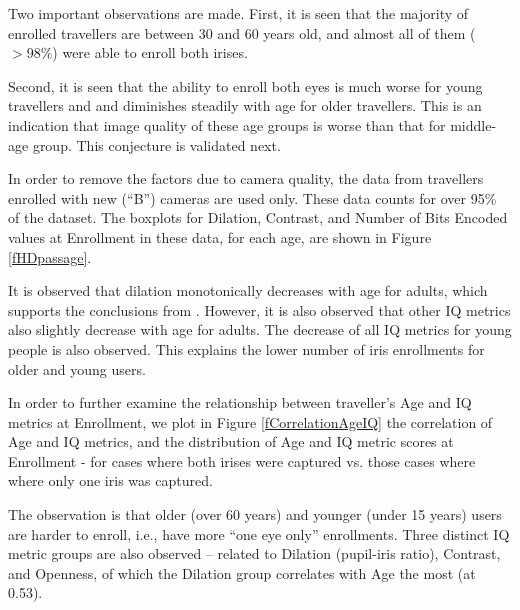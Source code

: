 \documentclass{cta-author}%
\begin{document}


Two important observations are made. 
First, it is seen that the majority of enrolled travellers are between 30 and 60 years old, 
and almost all of them ($>98\%$) were able to enroll both irises.

Second, it is seen that 
the ability to enroll both eyes is much worse for young travellers and  and diminishes steadily with age for older travellers. 
This is an indication that image quality of these age groups  is worse than that for middle-age group.
This conjecture is  validated next. 

In order to remove the factors due to camera quality, the data from travellers enrolled with new  (``B'') cameras are used only.
These data counts for over 95\% of the dataset.
The boxplots for Dilation, Contrast, and Number of Bits Encoded values at Enrollment in these data, for each age, 
are shown in Figure \ref{fHDpassage}.

It is observed that dilation monotonically decreases with age for adults, 
which supports the conclusions from \cite{irexVI}.
However, it is also observed that other IQ metrics also slightly decrease with age for adults.
The decrease of all IQ metrics for young people is also observed. 
This explains the lower number of iris enrollments for older and young users.

In order to further examine the relationship between traveller's Age and IQ metrics at Enrollment, we plot in Figure \ref{fCorrelationAgeIQ} 
the correlation of Age and IQ metrics, and  the distribution of  Age and IQ metric scores at Enrollment - for cases where both irises were captured vs. those cases where  where only one iris was captured.  

The observation is that  older (over 60 years) and younger (under 15 years) users are harder to enroll, i.e.,  have more ``one eye only'' enrollments.
Three distinct IQ metric groups  are also observed --  related to Dilation (pupil-iris ratio), Contrast, and Openness, 
of which the Dilation group correlates with Age the most (at 0.53).
\end{document}
